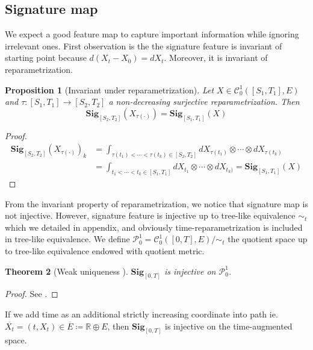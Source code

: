 \documentclass[12pt]{report}
\newtheorem{theorem}{Theorem}[chapter]
\newtheorem{proposition}[theorem]{Proposition}
\theoremstyle{definition}
\theoremstyle{remark}
\newcommand{\R}{\mathbb{R}}
\begin{document}
\subsection{Signature map}
We expect a good feature map to capture important information while ignoring irrelevant ones. First observation is the the signature feature is invariant of starting point because $d(X_{t} - X_{0}) = dX_{t}$. Moreover, it is invariant of reparametrization.
\begin{proposition}[Invariant under reparametrization]
  Let $X \in \mathcal{C}^{1}_{0}([S_{1},T_{1}],E)$ and  $\tau\colon [S_{1},T_{1}] \to [S_{2},T_{2}]$ a non-decreasing surjective reparametrization. Then 
  \begin{equation}
    \mathbf{Sig}_{[S_{2},T_{2}]}(X_{\tau(\cdot)}) = \mathbf{Sig}_{[S_{1},T_{1}]}(X) 
  \end{equation}
\end{proposition}
\begin{proof}
  \begin{equation}
    \begin{split}
      \mathbf{Sig}_{[S_{2},T_{2}]}(X_{\tau(\cdot)})_{k} &= \int_{\tau(t_{1})<\cdots< \tau(t_{k}) \in [S_{2},T_{2}]}dX_{\tau(t_{1})}\otimes\cdots\otimes dX_{\tau(t_{k})}\\
      &= \int_{t_{1}<\cdots< t_{k} \in [S_{1},T_{1}]}dX_{t_{1}}\otimes\cdots\otimes dX_{t_{k})} = \mathbf{Sig}_{[S_{1},T_{1}]}(X) 
    \end{split}
  \end{equation}
\end{proof}
From the invariant property of reparametrization, we notice that signature map is not injective. However, signature feature is injective up to tree-like equivalence $\sim_{t}$ which we detailed in appendix, and obviously time-reparametrization is included in tree-like equivalence. We define $\mathcal{P}_{0}^{1} = \mathcal{C}^{1}_{0}([0,T],E) / \sim_{t}$ the quotient space up to tree-like equivalence endowed with quotient metric.  
\begin{theorem}[Weak uniqueness \cite{boedihardjo2016signature}] 
  $\mathbf{Sig}_{[0,T]}$ is injective on $\mathcal{P}_{0}^{1}$.
\end{theorem}
\begin{proof}
  See \cite{boedihardjo2016signature}.
\end{proof}
If we add time as an additional strictly increasing coordinate into path ie. $\overline{X_{t}} = (t,X_{t}) \in \overline{E} \coloneq \R\oplus E$, then $\mathbf{Sig}_{[0,T]}$ is injective on the time-augmented space. 
\end{document}
